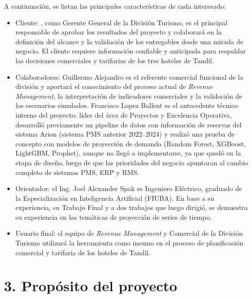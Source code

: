 \documentclass[
11pt, %
]{charter}
\begin{document}
A continuación, se listan las principales características de cada interesado:
\begin{itemize}
	\item Cliente: \clientename, como Gerente General de la División Turismo, es el principal responsable de aprobar los resultados del proyecto y colaborará en la definición del alcance y la validación de los entregables desde una mirada de negocio. El cliente requiere información confiable y anticipada para respaldar las decisiones comerciales y tarifarias de los tres hoteles de Tandil.
	\item Colaboradores: Guillermo Alejandro es el referente comercial funcional de la división y aportará el conocimiento del proceso actual de \textit{Revenue Management}, la interpretación de indicadores comerciales y la validación de los escenarios simulados. Francisco Lopez Ballent es el antecedente técnico interno del proyecto: líder del área de Proyectos y Excelencia Operativa, desarrolló previamente un pipeline de datos con información de reservas del sistema Arion (sistema PMS anterior 2022–2024) y realizó una prueba de concepto con modelos de proyección de demanda (Random Forest, XGBoost, LightGBM, Prophet), aunque no llegó a implementarse, ya que quedó en la etapa de diseño, luego de que las prioridades del negocio apuntaran al cambio completo de sistemas PMS, ERP y RMS.
	\item Orientador: el Ing. Joel Alexander Spak es Ingeniero Eléctrico, graduado de la Especialización en Inteligencia Artificial (FIUBA). En base a su experiencia, su Trabajo Final y a dos trabajos que luego dirigió, se demuestra su experiencia en las temáticas de proyección de series de tiempo.
	\item Usuario final: el equipo de \textit{Revenue Management} y Comercial de la División Turismo utilizará la herramienta como insumo en el proceso de planificación comercial y tarifaria de los hoteles de Tandil.
\end{itemize}


\section{3. Propósito del proyecto}
\label{sec:proposito}
\end{document}
